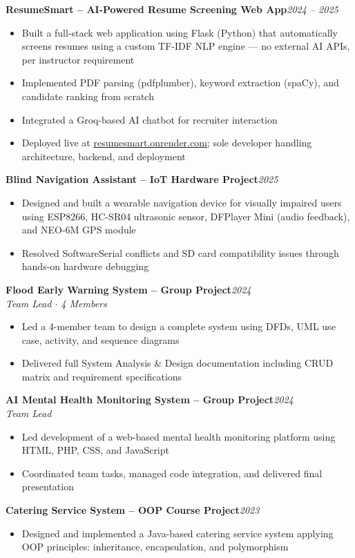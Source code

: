 \documentclass[10pt, a4paper]{article}
\newcommand{\cventry}[3]{%
  \vspace{4pt}%
  \noindent\textbf{\color{darkgray}#1}\hfill{\color{midgray}\textit{#3}}%
  \if\relax\detokenize{#2}\relax\else\\[1pt]\textit{\color{midgray}#2}\fi
  \vspace{2pt}%
}
\begin{document}
\cventry{ResumeSmart -- AI-Powered Resume Screening Web App}{}{2024 -- 2025}
\begin{itemize}
  \item Built a full-stack web application using Flask (Python) that automatically screens resumes
        using a custom TF-IDF NLP engine --- no external AI APIs, per instructor requirement
  \item Implemented PDF parsing (pdfplumber), keyword extraction (spaCy), and candidate ranking from scratch
  \item Integrated a Groq-based AI chatbot for recruiter interaction
  \item Deployed live at \href{https://resumesmart.onrender.com}{resumesmart.onrender.com};
        sole developer handling architecture, backend, and deployment
\end{itemize}

\cventry{Blind Navigation Assistant -- IoT Hardware Project}{}{2025}
\begin{itemize}
  \item Designed and built a wearable navigation device for visually impaired users using
        ESP8266, HC-SR04 ultrasonic sensor, DFPlayer Mini (audio feedback), and NEO-6M GPS module
  \item Resolved SoftwareSerial conflicts and SD card compatibility issues through hands-on hardware debugging
\end{itemize}

\cventry{Flood Early Warning System -- Group Project}{Team Lead $\cdot$ 4 Members}{2024}
\begin{itemize}
  \item Led a 4-member team to design a complete system using DFDs, UML use case,
        activity, and sequence diagrams
  \item Delivered full System Analysis \& Design documentation including CRUD matrix
        and requirement specifications
\end{itemize}

\cventry{AI Mental Health Monitoring System -- Group Project}{Team Lead}{2024}
\begin{itemize}
  \item Led development of a web-based mental health monitoring platform using HTML, PHP, CSS, and JavaScript
  \item Coordinated team tasks, managed code integration, and delivered final presentation
\end{itemize}

\cventry{Catering Service System -- OOP Course Project}{}{2023}
\begin{itemize}
  \item Designed and implemented a Java-based catering service system applying OOP principles:
        inheritance, encapsulation, and polymorphism
\end{itemize}
\end{document}
